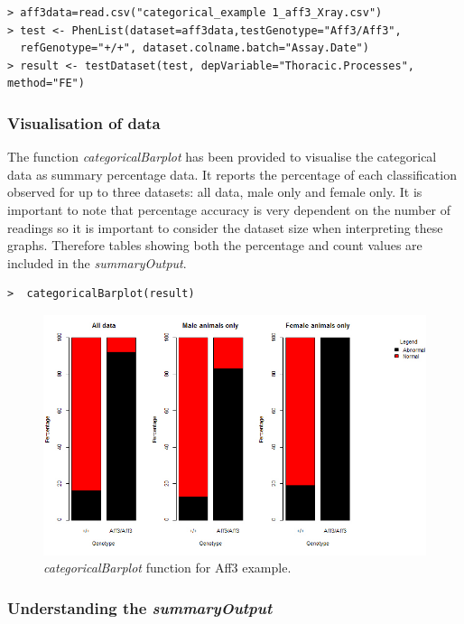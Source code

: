 \documentclass[12pt,a4paper]{article}
\begin{document}
\begingroup
    \fontsize{8pt}{12pt}\selectfont
\begin{verbatim}
> aff3data=read.csv("categorical_example 1_aff3_Xray.csv")
> test <- PhenList(dataset=aff3data,testGenotype="Aff3/Aff3", 
  refGenotype="+/+", dataset.colname.batch="Assay.Date")
> result <- testDataset(test, depVariable="Thoracic.Processes", method="FE")
\end{verbatim}
\endgroup 

\subsubsection{Visualisation of data}
The function \textit{categoricalBarplot} has been provided to visualise the categorical data as summary percentage data. 
It reports the percentage of each classification observed for up to three datasets: all data, male only and female only.  
It is important to note that percentage accuracy is very dependent on the number of readings so it is important to consider the dataset size when interpreting these graphs.  
Therefore tables showing both the percentage and count values are included in the \textit{summaryOutput}. 

\begingroup
    \fontsize{8pt}{12pt}\selectfont
\begin{verbatim}
>  categoricalBarplot(result)
\end{verbatim}
\endgroup 

\begin{figure}[H]%
\centerline{\includegraphics[scale=0.5]{cs2_categoricalBarplot.jpg}}
\caption{\textit{categoricalBarplot} function for Aff3 example.}\label{fig:23}
\end{figure}

\subsubsection{Understanding the \textit{summaryOutput}}
\end{document}
